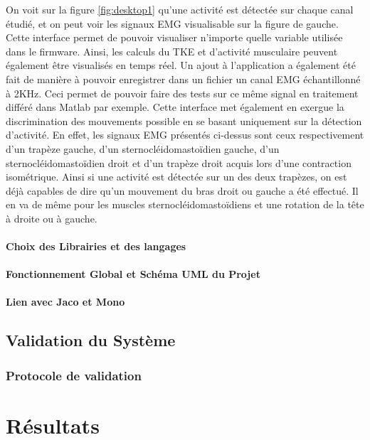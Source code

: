 \documentclass[letterpaper, twoside, 12pt, memoire, creativecommons, hyperref]{thETS}
\begin{document}
On voit sur la figure \ref{fig:desktop1} qu’une activité est détectée sur chaque canal étudié, et on peut voir les signaux EMG visualisable sur la figure de gauche. Cette interface permet de pouvoir visualiser n’importe quelle variable utilisée dans le firmware. Ainsi, les calculs du TKE et d'activité musculaire peuvent également être visualisés en temps réel.
Un ajout à l’application a également été fait de manière à pouvoir enregistrer dans un fichier un canal EMG échantillonné à 2KHz. Ceci permet de pouvoir faire des tests sur ce même signal en traitement différé dans Matlab par exemple.
Cette interface met également en exergue la discrimination des mouvements possible en se basant uniquement sur la détection d’activité. En effet, les signaux EMG présentés ci-dessus sont ceux respectivement d’un trapèze gauche, d’un sternocléidomastoïdien gauche, d’un sternocléidomastoïdien droit et d’un trapèze droit acquis lors d’une contraction isométrique. Ainsi si une activité est détectée sur un des deux trapèzes, on est déjà capables de dire qu’un mouvement du bras droit ou gauche a été effectué. Il en va de même pour les muscles sternocléidomastoïdiens et une rotation de la tête à droite ou à gauche. 


\subsubsection{Choix des Librairies et des langages}

\subsubsection{Fonctionnement Global et Schéma UML du Projet}

\subsubsection{Lien avec Jaco et Mono}

\section{Validation du Système}

\subsection{Protocole de validation}

\chapter{Résultats}
\end{document}
